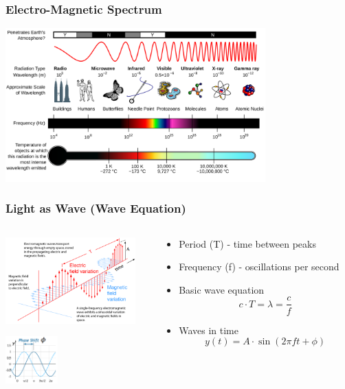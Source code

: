 \documentclass{beamer}
\begin{document}
\begin{frame}\frametitle{Electro-Magnetic Spectrum}
\begin{center}
\includegraphics[width=10cm]{fig/emspectrum.png}
\end{center}
\end{frame}


\begin{frame}\frametitle{Light as Wave (Wave Equation)}
\begin{columns}
\begin{column}{6cm}
\begin{center}
\includegraphics[width=5cm]{fig/emwave3.png}

\vspace{1cm}

\includegraphics[width=2cm]{fig/phi.png}

\end{center}
\end{column}
\begin{column}{6cm}
\begin{itemize}
\item Period (T) - time between peaks
\item Frequency (f) - oscillations per second
\item Basic wave equation
\[ c \cdot T = \lambda = \frac{c}{f}\]
\item Waves in time
\[y(t) = A \cdot \sin{(2 \pi f t+ \phi)}\]
\end{itemize}

\end{column}
\end{columns}
\end{frame}
\end{document}
